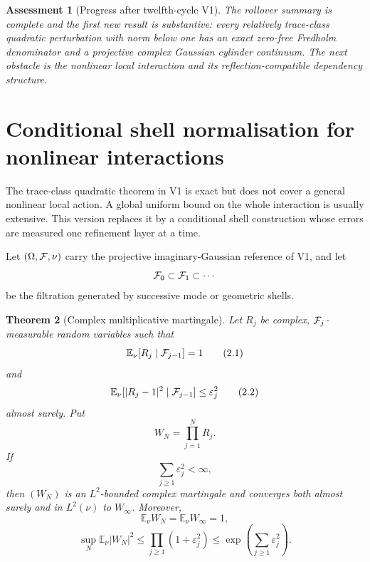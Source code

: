 \documentclass[11pt]{article}
\newtheorem{theorem}{Theorem}[section]
\newtheorem{assessment}[theorem]{Assessment}
\theoremstyle{remark}
\begin{document}
\begin{assessment}[Progress after twelfth-cycle V1]
\label{ass:v12v1-status}
The rollover summary is complete and the first new result is
substantive: every relatively trace-class quadratic perturbation with
norm below one has an exact zero-free Fredholm denominator and a
projective complex Gaussian cylinder continuum.  The next obstacle is
the nonlinear local interaction and its reflection-compatible
dependency structure.
\end{assessment}


\section{Conditional shell normalisation for nonlinear interactions}
\label{sec:v12v2}

The trace-class quadratic theorem in V1 is exact but does not cover a
general nonlinear local action.  A global uniform bound on the whole
interaction is usually extensive.  This version replaces it by a
conditional shell construction whose errors are measured one
refinement layer at a time.

Let \((\Omega,{\cal F},\nu)\) carry the projective imaginary-Gaussian
reference of V1, and let
\[
              {\cal F}_0\subset{\cal F}_1\subset\cdots
\]
be the filtration generated by successive mode or geometric shells.

\begin{theorem}[Complex multiplicative martingale]
\label{thm:v12v2-martingale}
Let \(R_j\) be complex, \({\cal F}_j\)-measurable random variables
such that
\[
                 \mathbb E_\nu[R_j\mid{\cal F}_{j-1}]=1      \tag{2.1}
\]
and
\[
 \mathbb E_\nu[|R_j-1|^2\mid{\cal F}_{j-1}]
                         \le\varepsilon_j^2                 \tag{2.2}
\]
almost surely.  Put
\[
                              W_N=\prod_{j=1}^NR_j.           \tag{2.3}
\]
If
\[
                              \sum_{j\ge1}\varepsilon_j^2<\infty,
                                                                    \tag{2.4}
\]
then \((W_N)\) is an \(L^2\)-bounded complex martingale and converges
both almost surely and in \(L^2(\nu)\) to \(W_\infty\).  Moreover,
\[
 \mathbb E_\nu W_N=\mathbb E_\nu W_\infty=1,                \tag{2.5}
\]
\[
 \sup_N\mathbb E_\nu|W_N|^2
 \le\prod_{j\ge1}(1+\varepsilon_j^2)
 \le\exp\left(\sum_{j\ge1}\varepsilon_j^2\right).            \tag{2.6}
\]
\end{theorem}
\end{document}
